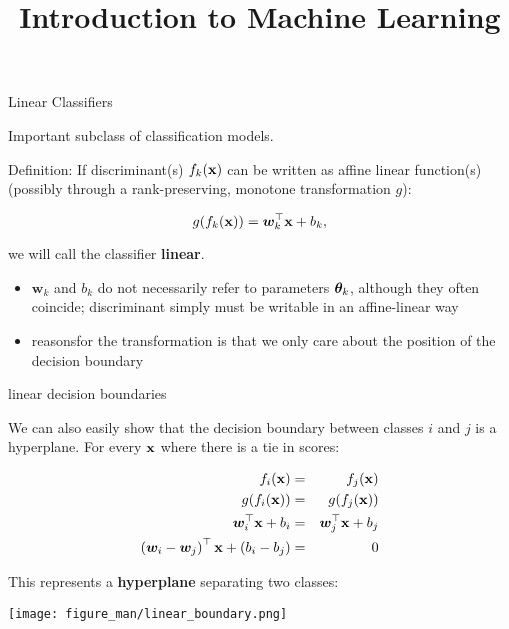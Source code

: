 \documentclass[11pt,compress,t,notes=noshow, xcolor=table]{beamer}
\title{Introduction to Machine Learning}
\begin{document}

\framebreak


\begin{vbframe}{Linear Classifiers}

Important subclass of classification models. 

\lz

Definition: 
If discriminant(s) $\fkx$ can be written as affine linear function(s)
(possibly through a rank-preserving, monotone transformation $g$):

$$
  g(\fkx) = \bm{w}_k^\top \xv + b_k,
$$

we will call the classifier \textbf{linear}. 

\vfill

\begin{itemize}
\item $\bm{w}_k$ and $b_k$ do not necessarily refer to parameters $\thetav_k$, although they often coincide; discriminant simply must be writable in an affine-linear way 
\item reasonsfor the transformation is that we only care about the position of the decision boundary
\end{itemize}


\end{vbframe}

  
\begin{vbframe}{linear decision boundaries}
  
We can also easily show that the decision boundary between classes $i$ and $j$ is a hyperplane. For every $\xv$ where there is a tie in scores: 

\begin{eqnarray*}
  \fkx[i] &=& \fkx[j] \\
  g(\fkx[i]) &=& g(\fkx[j]) \\
  \bm{w}_i^\top \xv + b_i &=& \bm{w}_j^\top \xv + b_j \\
  \left(\bm{w}_i - \bm{w}_j\right)^\top \xv + \left(b_i - b_j\right) &=& 0 
\end{eqnarray*}

This represents a \textbf{hyperplane} separating two classes:

\begin{center}
\texttt{[image: figure\_man/linear\_boundary.png]} 
\end{center}
\end{vbframe}
\end{document}
